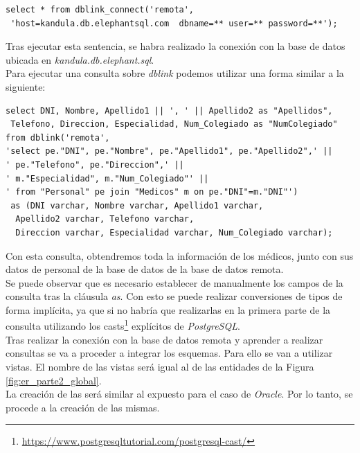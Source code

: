 \documentclass{article}
\begin{document}
\begin{lstlisting}
select * from dblink_connect('remota',
 'host=kandula.db.elephantsql.com  dbname=** user=** password=**');
\end{lstlisting}

Tras ejecutar esta sentencia, se habra realizado la conexión con la base de datos ubicada en \emph{kandula.db.elephant.sql}.\\
Para ejecutar una consulta sobre \emph{dblink} podemos utilizar una forma similar a la siguiente:

\begin{lstlisting}
select DNI, Nombre, Apellido1 || ', ' || Apellido2 as "Apellidos",
 Telefono, Direccion, Especialidad, Num_Colegiado as "NumColegiado"
from dblink('remota', 
'select pe."DNI", pe."Nombre", pe."Apellido1", pe."Apellido2",' || 
' pe."Telefono", pe."Direccion",' || 
' m."Especialidad", m."Num_Colegiado"' ||
' from "Personal" pe join "Medicos" m on pe."DNI"=m."DNI"') 
 as (DNI varchar, Nombre varchar, Apellido1 varchar,
  Apellido2 varchar, Telefono varchar,
  Direccion varchar, Especialidad varchar, Num_Colegiado varchar);
\end{lstlisting}

Con esta consulta, obtendremos toda la información de los médicos, junto con sus datos de personal de la base de datos de la base de datos remota.\\
Se puede observar que es necesario establecer de manualmente los campos de la consulta tras la cláusula \emph{as}. Con esto se puede realizar conversiones de tipos de forma implícita, ya que si no habría que realizarlas en la primera parte de la consulta utilizando los casts\footnote{\url{https://www.postgresqltutorial.com/postgresql-cast/}} explícitos de \emph{PostgreSQL}.\\

Tras realizar la conexión con la base de datos remota y aprender a realizar consultas se va a proceder a integrar los esquemas. Para ello se van a utilizar vistas. El nombre de las vistas será igual al de las entidades de la Figura \ref{fig:er_parte2_global}.\\
La creación de las será similar al expuesto para el caso de \emph{Oracle}.
Por lo tanto, se procede a la creación de las mismas.
\end{document}

